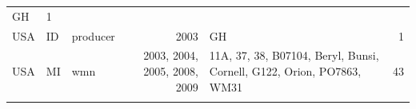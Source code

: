 \documentclass[fleqn,10pt,lineno]{wlpeerj} %
\theoremstyle{definition}
\theoremstyle{definition}
\theoremstyle{definition}
\theoremstyle{remark}
\begin{document}
\begin{longtable}[]{@{}lllrlr@{}}
\begin{minipage}[t]{0.29\columnwidth}
GH\strut
\end{minipage} & \begin{minipage}[t]{0.04\columnwidth}\raggedleft\strut
1\strut
\end{minipage}\tabularnewline
\begin{minipage}[t]{0.11\columnwidth}\raggedright\strut
USA\strut
\end{minipage} & \begin{minipage}[t]{0.08\columnwidth}\raggedright\strut
ID\strut
\end{minipage} & \begin{minipage}[t]{0.12\columnwidth}\raggedright\strut
producer\strut
\end{minipage} & \begin{minipage}[t]{0.19\columnwidth}\raggedleft\strut
2003\strut
\end{minipage} & \begin{minipage}[t]{0.29\columnwidth}\raggedright\strut
GH\strut
\end{minipage} & \begin{minipage}[t]{0.04\columnwidth}\raggedleft\strut
1\strut
\end{minipage}\tabularnewline
\begin{minipage}[t]{0.11\columnwidth}\raggedright\strut
USA\strut
\end{minipage} & \begin{minipage}[t]{0.08\columnwidth}\raggedright\strut
MI\strut
\end{minipage} & \begin{minipage}[t]{0.12\columnwidth}\raggedright\strut
wmn\strut
\end{minipage} & \begin{minipage}[t]{0.19\columnwidth}\raggedleft\strut
2003, 2004, 2005, 2008, 2009\strut
\end{minipage} & \begin{minipage}[t]{0.29\columnwidth}\raggedright\strut
11A, 37, 38, B07104, Beryl, Bunsi, Cornell, G122, Orion, PO7863,
WM31\strut
\end{minipage} & \begin{minipage}[t]{0.04\columnwidth}\raggedleft\strut
43\strut
\end{minipage}\tabularnewline
\begin{minipage}[t]{0.11\columnwidth}\raggedright\strut
\strut
\end{minipage} & \begin{minipage}[t]{0.08\columnwidth}\raggedright\strut
\strut
\end{minipage} & \begin{minipage}[t]{0.12\columnwidth}\raggedright\strut

\end{minipage}
\end{longtable}
\end{document}
